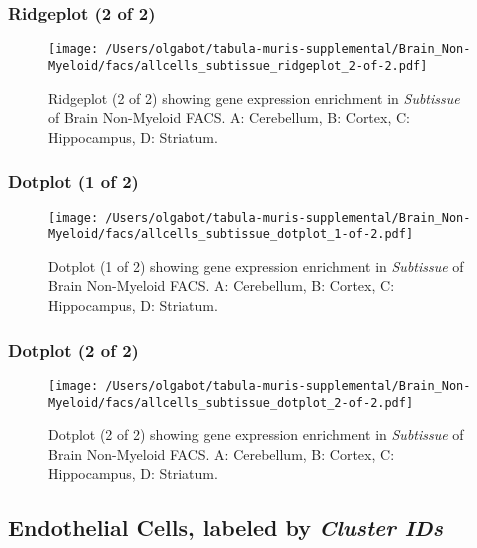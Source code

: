 \clearpage

\subsubsection{Ridgeplot (2 of 2)}
\begin{figure}[h]
\centering
\texttt{[image: /Users/olgabot/tabula-muris-supplemental/Brain\_Non-Myeloid/facs/allcells\_subtissue\_ridgeplot\_2-of-2.pdf]}

\caption{ Ridgeplot (2 of 2)  showing gene expression enrichment in \emph{Subtissue} of Brain Non-Myeloid FACS. A: Cerebellum, B: Cortex, C: Hippocampus, D: Striatum.}
\end{figure}


\clearpage

\subsubsection{Dotplot (1 of 2)}
\begin{figure}[h]
\centering
\texttt{[image: /Users/olgabot/tabula-muris-supplemental/Brain\_Non-Myeloid/facs/allcells\_subtissue\_dotplot\_1-of-2.pdf]}

\caption{ Dotplot (1 of 2)  showing gene expression enrichment in \emph{Subtissue} of Brain Non-Myeloid FACS. A: Cerebellum, B: Cortex, C: Hippocampus, D: Striatum.}
\end{figure}


\clearpage

\subsubsection{Dotplot (2 of 2)}
\begin{figure}[h]
\centering
\texttt{[image: /Users/olgabot/tabula-muris-supplemental/Brain\_Non-Myeloid/facs/allcells\_subtissue\_dotplot\_2-of-2.pdf]}

\caption{ Dotplot (2 of 2)  showing gene expression enrichment in \emph{Subtissue} of Brain Non-Myeloid FACS. A: Cerebellum, B: Cortex, C: Hippocampus, D: Striatum.}
\end{figure}


\clearpage

\subsection{Endothelial Cells, labeled by \emph{Cluster IDs}}
